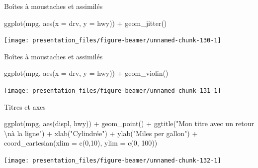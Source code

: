 \documentclass[12pt,handout,ignorenonframetext,]{beamer}
\newenvironment{Shaded}{}{}
\newcommand{\KeywordTok}[1]{\textcolor[rgb]{0.00,0.00,1.00}{{#1}}}
\newcommand{\DataTypeTok}[1]{{#1}}
\newcommand{\DecValTok}[1]{{#1}}
\newcommand{\CharTok}[1]{\textcolor[rgb]{0.00,0.50,0.50}{{#1}}}
\newcommand{\StringTok}[1]{\textcolor[rgb]{0.00,0.50,0.50}{{#1}}}
\newcommand{\NormalTok}[1]{{#1}}
\renewenvironment{Shaded}{\begin{snugshade}}{\end{snugshade}}
\begin{document}
\begin{frame}[fragile]{Boîtes à moustaches et assimilés}

\footnotesize \center

\begin{Shaded}
\begin{Highlighting}[]
\KeywordTok{ggplot}\NormalTok{(mpg, }\KeywordTok{aes}\NormalTok{(}\DataTypeTok{x =} \NormalTok{drv, }\DataTypeTok{y =} \NormalTok{hwy)) +}\StringTok{ }
\StringTok{  }\KeywordTok{geom_jitter}\NormalTok{()}
\end{Highlighting}
\end{Shaded}

\texttt{[image: presentation\_files/figure-beamer/unnamed-chunk-130-1]}

\end{frame}

\begin{frame}[fragile]{Boîtes à moustaches et assimilés}

\footnotesize \center

\begin{Shaded}
\begin{Highlighting}[]
\KeywordTok{ggplot}\NormalTok{(mpg, }\KeywordTok{aes}\NormalTok{(}\DataTypeTok{x =} \NormalTok{drv, }\DataTypeTok{y =} \NormalTok{hwy)) +}\StringTok{ }
\StringTok{  }\KeywordTok{geom_violin}\NormalTok{()}
\end{Highlighting}
\end{Shaded}

\texttt{[image: presentation\_files/figure-beamer/unnamed-chunk-131-1]}

\end{frame}

\begin{frame}[fragile]{Titres et axes}

\footnotesize \center

\begin{Shaded}
\begin{Highlighting}[]
\KeywordTok{ggplot}\NormalTok{(mpg, }\KeywordTok{aes}\NormalTok{(displ, hwy)) +}\StringTok{ }\KeywordTok{geom_point}\NormalTok{() +}\StringTok{ }
\StringTok{  }\KeywordTok{ggtitle}\NormalTok{(}\StringTok{"Mon titre avec un retour }\CharTok{\textbackslash{}n}\StringTok{à la ligne"}\NormalTok{) +}
\StringTok{  }\KeywordTok{xlab}\NormalTok{(}\StringTok{"Cylindrée"}\NormalTok{) +}\StringTok{ }\KeywordTok{ylab}\NormalTok{(}\StringTok{"Miles per gallon"}\NormalTok{) +}
\StringTok{  }\KeywordTok{coord_cartesian}\NormalTok{(}\DataTypeTok{xlim =} \KeywordTok{c}\NormalTok{(}\DecValTok{0}\NormalTok{,}\DecValTok{10}\NormalTok{), }\DataTypeTok{ylim =} \KeywordTok{c}\NormalTok{(}\DecValTok{0}\NormalTok{, }\DecValTok{100}\NormalTok{))}
\end{Highlighting}
\end{Shaded}

\texttt{[image: presentation\_files/figure-beamer/unnamed-chunk-132-1]}

\end{frame}
\end{document}
